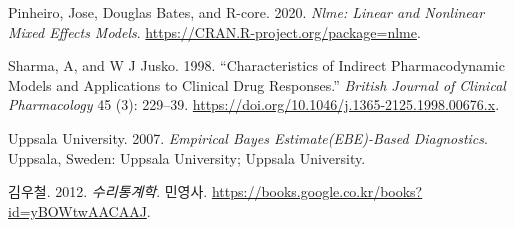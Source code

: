 \documentclass[
  10pt,
]{krantz}
\newlength{\cslhangindent}
\newenvironment{cslreferences}%
  {\setlength{\parindent}{0pt}%
  \everypar{\setlength{\hangindent}{\cslhangindent}}\ignorespaces}%
  {\par}
\begin{document}
\begin{cslreferences}
\leavevmode\hypertarget{ref-R-nlme}{}%
Pinheiro, Jose, Douglas Bates, and R-core. 2020. \emph{Nlme: Linear and Nonlinear Mixed Effects Models}. \url{https://CRAN.R-project.org/package=nlme}.

\leavevmode\hypertarget{ref-sharma1998characteristics}{}%
Sharma, A, and W J Jusko. 1998. ``Characteristics of Indirect Pharmacodynamic Models and Applications to Clinical Drug Responses.'' \emph{British Journal of Clinical Pharmacology} 45 (3): 229--39. \url{https://doi.org/10.1046/j.1365-2125.1998.00676.x}.

\leavevmode\hypertarget{ref-uppsala}{}%
Uppsala University. 2007. \emph{Empirical Bayes Estimate(EBE)-Based Diagnostics}. Uppsala, Sweden: Uppsala University; Uppsala University.

\leavevmode\hypertarget{ref-kim}{}%
김우철. 2012. \emph{수리통계학}. 민영사. \url{https://books.google.co.kr/books?id=yBOWtwAACAAJ}.
\end{cslreferences}

\printindex
\end{document}
